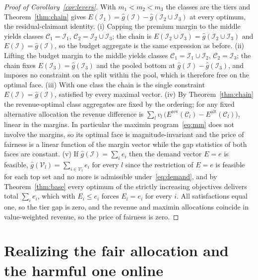 \documentclass[manuscript, screen, review, anonymous]{acmart}
\begin{document}
\begin{proof}[Proof of Corollary~\ref{cor:levers}]
With $m_1<m_2<m_3$ the classes are the tiers and Theorem~\ref{thm:chain} gives $E(\mathcal{I}_1)=\hat g(\mathcal{I})-\hat g(\mathcal{I}_2\cup\mathcal{I}_3)$ at every optimum, the residual-claimant identity. (i) Capping the premium margin to the middle yields classes $\mathcal{C}_1=\mathcal{I}_1$, $\mathcal{C}_2=\mathcal{I}_2\cup\mathcal{I}_3$; the chain is $E(\mathcal{I}_2\cup\mathcal{I}_3)=\hat g(\mathcal{I}_2\cup\mathcal{I}_3)$ and $E(\mathcal{I})=\hat g(\mathcal{I})$, so the budget aggregate is the same expression as before. (ii) Lifting the budget margin to the middle yields classes $\mathcal{C}_1=\mathcal{I}_1\cup\mathcal{I}_2$, $\mathcal{C}_2=\mathcal{I}_3$; the chain fixes $E(\mathcal{I}_3)=\hat g(\mathcal{I}_3)$ and the pooled bottom at $\hat g(\mathcal{I})-\hat g(\mathcal{I}_3)$, and imposes no constraint on the split within the pool, which is therefore free on the optimal face. (iii) With one class the chain is the single constraint $E(\mathcal{I})=\hat g(\mathcal{I})$, satisfied by every maximal vector. (iv) By Theorem~\ref{thm:chain} the revenue-optimal class aggregates are fixed by the ordering; for any fixed alternative allocation the revenue difference is $\sum_l v_l\,\big(E^{\mathrm{rev}}(\mathcal{C}_l)-E^{\mathrm{alt}}(\mathcal{C}_l)\big)$, linear in the margins. In particular the maximin program~\eqref{eq:mm} does not involve the margins, so its optimal face is magnitude-invariant and the price of fairness is a linear function of the margin vector while the gap statistics of both faces are constant. (v) If $\hat g(\mathcal{I})=\sum_i e_i$ then the demand vector $E=e$ is feasible, $\hat g(\mathcal{V}_l)=\sum_{i\in\mathcal{V}_l}e_i$ for every $l$ since the restriction of $E=e$ is feasible for each top set and no more is admissible under~\eqref{eq:demand}, and by Theorem~\ref{thm:base} every optimum of the strictly increasing objectives delivers total $\sum_i e_i$, which with $E_i\le e_i$ forces $E_i=e_i$ for every $i$. All satisfactions equal one, so the tier gap is zero, and the revenue and maximin allocations coincide in value-weighted revenue, so the price of fairness is zero.
\end{proof}

\section{Realizing the fair allocation and the harmful one online}
\label{app:online}
\end{document}
